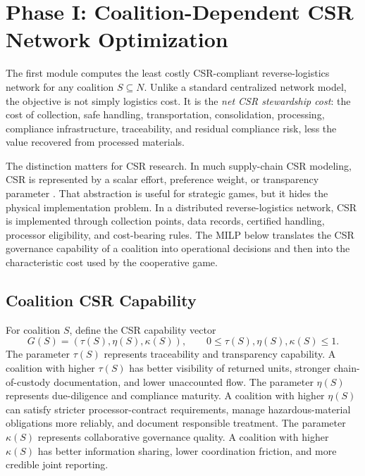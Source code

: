 \section{Phase I: Coalition-Dependent CSR Network Optimization}
\label{sec:milp}

The first module computes the least costly CSR-compliant reverse-logistics network for any coalition $S\subseteq N$. Unlike a standard centralized network model, the objective is not simply logistics cost. It is the \emph{net CSR stewardship cost}: the cost of collection, safe handling, transportation, consolidation, processing, compliance infrastructure, traceability, and residual compliance risk, less the value recovered from processed materials.

The distinction matters for CSR research. In much supply-chain CSR modeling, CSR is represented by a scalar effort, preference weight, or transparency parameter \cite{Buccella2024,FantiBuccella2017,Ferrara2017,Khosroshahi2019,Mahdiraji2023}. That abstraction is useful for strategic games, but it hides the physical implementation problem. In a distributed reverse-logistics network, CSR is implemented through collection points, data records, certified handling, processor eligibility, and cost-bearing rules. The MILP below translates the CSR governance capability of a coalition into operational decisions and then into the characteristic cost used by the cooperative game.

\subsection{Coalition CSR Capability}

For coalition $S$, define the CSR capability vector
\begin{equation}
\label{eq:ch4_governance_vector}
G(S)=\left(\tau(S),\eta(S),\kappa(S)\right),
\qquad
0\leq \tau(S),\eta(S),\kappa(S)\leq 1.
\end{equation}
The parameter $\tau(S)$ represents traceability and transparency capability. A coalition with higher $\tau(S)$ has better visibility of returned units, stronger chain-of-custody documentation, and lower unaccounted flow. The parameter $\eta(S)$ represents due-diligence and compliance maturity. A coalition with higher $\eta(S)$ can satisfy stricter processor-contract requirements, manage hazardous-material obligations more reliably, and document responsible treatment. The parameter $\kappa(S)$ represents collaborative governance quality. A coalition with higher $\kappa(S)$ has better information sharing, lower coordination friction, and more credible joint reporting.

